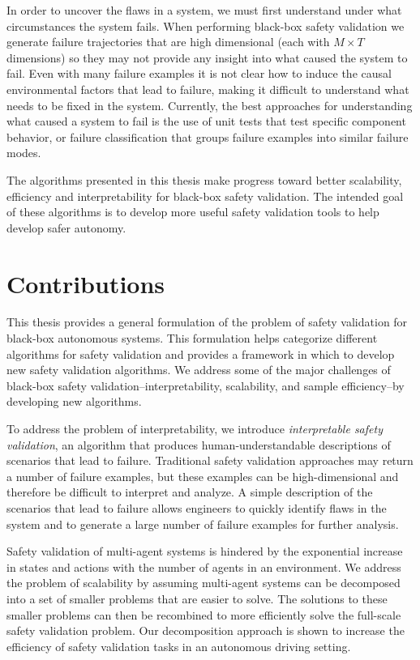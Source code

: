 In order to uncover the flaws in a system, we must first understand under what circumstances the system fails. When performing black-box safety validation we generate failure trajectories that are high dimensional (each with $M \times T$ dimensions) so they may not provide any insight into what caused the system to fail. Even with many failure examples it is not clear how to induce the causal environmental factors that lead to failure, making it difficult to understand what needs to be fixed in the system. Currently, the best approaches for understanding what caused a system to fail is the use of unit tests that test specific component behavior, or failure classification that groups failure examples into similar failure modes. 

The algorithms presented in this thesis make progress toward better scalability, efficiency and interpretability for black-box safety validation. The intended goal of these algorithms is to develop more useful safety validation tools to help develop safer autonomy.


\section{Contributions}

This thesis provides a general formulation of the problem of safety validation for black-box autonomous systems. This formulation helps categorize different algorithms for safety validation and provides a framework in which to develop new safety validation algorithms. We address some of the major challenges of black-box safety validation--interpretability, scalability, and sample efficiency--by developing new algorithms.

To address the problem of interpretability, we introduce \emph{interpretable safety validation}, an algorithm that produces human-understandable descriptions of scenarios that lead to failure. Traditional safety validation approaches may return a number of failure examples, but these examples can be high-dimensional and therefore be difficult to interpret and analyze. A simple description of the scenarios that lead to failure allows engineers to quickly identify flaws in the system and to generate a large number of failure examples for further analysis. 

Safety validation of multi-agent systems is hindered by the exponential increase in states and actions with the number of agents in an environment. We address the problem of scalability by assuming multi-agent systems can be decomposed into a set of smaller problems that are easier to solve. The solutions to these smaller problems can then be recombined to more efficiently solve the full-scale safety validation problem. Our decomposition approach is shown to increase the efficiency of safety validation tasks in an autonomous driving setting.

